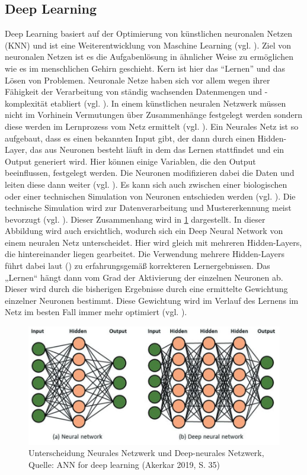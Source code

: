 \subsection{Deep Learning}
Deep Learning basiert auf der Optimierung von künstlichen neuronalen Netzen (KNN) und ist eine Weiterentwicklung von Maschine Learning (vgl. \cite[S. 1]{Georgevici.2019}). Ziel von neuronalen Netzen ist es die Aufgabenlösung in ähnlicher Weise zu ermöglichen wie es im menschlichen Gehirn geschieht. Kern ist hier das “Lernen” und das Lösen von Problemen. Neuronale Netze haben sich vor allem wegen ihrer Fähigkeit der Verarbeitung von ständig wachsenden Datenmengen und -komplexität etabliert (vgl. \cite[S. 373]{Welsch.2018}). In einem künstlichen neuralen Netzwerk müssen nicht im Vorhinein Vermutungen über Zusammenhänge festgelegt werden sondern diese werden im Lernprozess vom Netz ermittelt (vgl. \cite[S. 581]{Backhaus.2018b}). Ein Neurales Netz ist 
so aufgebaut, dass es einen bekannten Input gibt, der dann durch einen Hidden-Layer, das aus Neuronen besteht läuft in dem das Lernen stattfindet und ein Output generiert wird. Hier können einige Variablen, die den Output 
beeinflussen, festgelegt werden. 
Die Neuronen modifizieren dabei die Daten und leiten diese dann weiter (vgl. \cite[S. 373]{Welsch.2018}). Es kann sich auch zwischen einer biologischen oder einer technischen Simulation von Neuronen entschieden werden (vgl. \cite{https:www.facebook.comspektrumverlag.04.12.2014}). Die technische Simulation wird zur Datenverarbeitung und Mustererkennung meist bevorzugt (vgl. \cite{https:www.facebook.comspektrumverlag.04.12.2014}). Dieser Zusammenhang wird in \ref{fig:NeuralVsDeepNeural} dargestellt. 
In dieser Abbildung wird auch ersichtlich, wodurch sich ein Deep Neural Network von einem neuralen Netz unterscheidet. Hier wird gleich mit mehreren Hidden-Layers, die hintereinander liegen gearbeitet. Die Verwendung mehrere Hidden-Layers führt dabei laut (\cite[S. 581]{Backhaus.2018b}) zu erfahrungsgemäß korrekteren Lernergebnissen. Das „Lernen“ hängt dann vom Grad der Aktivierung der einzelnen Neuronen ab. Dieser wird durch die bisherigen Ergebnisse durch eine ermittelte Gewichtung einzelner Neuronen bestimmt. Diese Gewichtung wird im Verlauf des Lernens im Netz im besten Fall immer mehr optimiert (vgl. \cite[S. 586]{Backhaus.2018b}).
\begin{figure}[ht]
\centering
\includegraphics[width=\linewidth]{pics/ANN_for_deep_learning_P35}
\caption{Unterscheidung Neurales Netzwerk und Deep-neurales Netzwerk, Quelle: ANN for deep learning (Akerkar 2019, S. 35)}
\label{fig:NeuralVsDeepNeural}
\end{figure}
